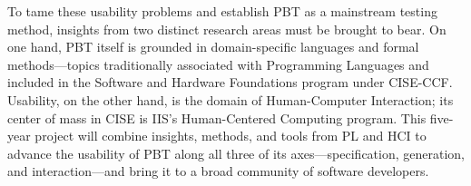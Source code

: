 


To tame these usability problems and establish PBT as a mainstream
testing method, insights from two distinct research areas must be
brought to bear.
On one hand, PBT itself is grounded in domain-specific languages and
formal methods---topics traditionally associated with Programming
Languages and included in the Software and Hardware Foundations
program under CISE-CCF.  Usability, on the other hand, is the domain
of Human-Computer Interaction; its center of mass in CISE is IIS's
Human-Centered Computing program.
%
This five-year project will combine insights, methods, and tools from
PL and HCI to advance the usability of PBT along all three of its
axes---specification, generation, and interaction\iflater{}\fi---and bring it to a
broad community of software developers.

